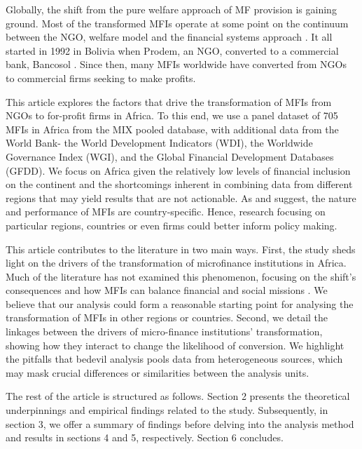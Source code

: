 \documentclass[a4paper, nobind]{templates/ociamthesis}
\begin{document}
Globally, the shift from the pure welfare approach of MF provision is gaining ground. Most of the transformed MFIs operate at some point on the continuum between the NGO, welfare model and the financial systems approach \autocite{armendariz2013subsidy,d2013unsubsidized,hishigsuren2006transformation}. It all started in 1992 in Bolivia when Prodem, an NGO, converted to a commercial bank, Bancosol \autocite{fernando2004micro,creedy2018types}. Since then, many MFIs worldwide have converted from NGOs to commercial firms seeking to make profits.

This article explores the factors that drive the transformation of MFIs from NGOs to for-profit firms in Africa. To this end, we use a panel dataset of 705 MFIs in Africa from the MIX pooled database, with additional data from the World Bank- the World Development Indicators (WDI), the Worldwide Governance Index (WGI), and the Global Financial Development Databases (GFDD). We focus on Africa given the relatively low levels of financial inclusion on the continent \autocite{demirguc2018global}and the shortcomings inherent in combining data from different regions that may yield results that are not actionable. As \textcite{d2017ngos} and \textcite{wang2015ownership} suggest, the nature and performance of MFIs are country-specific. Hence, research focusing on particular regions, countries or even firms could better inform policy making.

This article contributes to the literature in two main ways. First, the study sheds light on the drivers of the transformation of microfinance institutions in Africa. Much of the literature has not examined this phenomenon, focusing on the shift's consequences and how MFIs can balance financial and social missions \autocite{d2013unsubsidized,forkusam2014does,mia2017mission}. We believe that our analysis could form a reasonable starting point for analysing the transformation of MFIs in other regions or countries. Second, we detail the linkages between the drivers of micro-finance institutions' transformation, showing how they interact to change the likelihood of conversion. We highlight the pitfalls that bedevil analysis pools data from heterogeneous sources, which may mask crucial differences or similarities between the analysis units.

The rest of the article is structured as follows. Section 2 presents the theoretical underpinnings and empirical findings related to the study. Subsequently, in section 3, we offer a summary of findings before delving into the analysis method and results in sections 4 and 5, respectively. Section 6 concludes.
\end{document}
